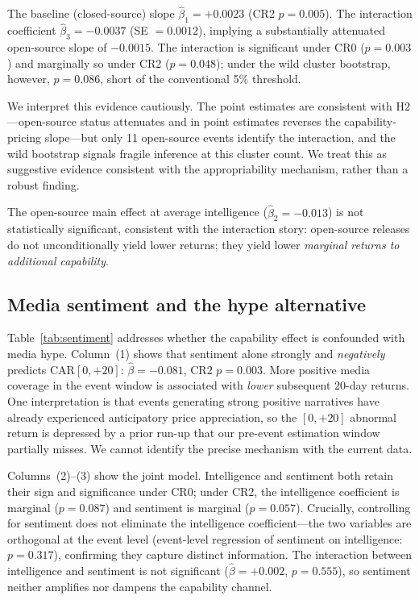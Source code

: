 \documentclass[12pt]{article}
\begin{document}
The baseline (closed-source) slope $\hat{\beta}_1 = +0.0023$ (CR2 $p = 0.005$).
The interaction coefficient $\hat{\beta}_3 = -0.0037$ (SE $= 0.0012$), implying
a substantially attenuated open-source slope of $-0.0015$. The interaction is
significant under CR0 ($p = 0.003$) and marginally so under CR2 ($p = 0.048$);
under the wild cluster bootstrap, however, $p = 0.086$, short of the conventional
5\% threshold.

We interpret this evidence cautiously. The point estimates are consistent with
H2---open-source status attenuates and in point estimates reverses the
capability-pricing slope---but only 11 open-source events identify the interaction,
and the wild bootstrap signals fragile inference at this cluster count. We treat
this as suggestive evidence consistent with the appropriability mechanism, rather
than a robust finding.

The open-source main effect at average intelligence ($\hat{\beta}_2 = -0.013$) is
not statistically significant, consistent with the interaction story: open-source
releases do not unconditionally yield lower returns; they yield lower
\emph{marginal returns to additional capability}.

\subsection{Media sentiment and the hype alternative}

Table~\ref{tab:sentiment} addresses whether the capability effect is confounded
with media hype. Column~(1) shows that sentiment alone strongly and
\emph{negatively} predicts CAR$[0,{+}20]$: $\hat{\beta} = -0.081$,
CR2 $p = 0.003$. More positive media coverage in the event window is associated
with \emph{lower} subsequent 20-day returns. One interpretation is that events
generating strong positive narratives have already experienced anticipatory price
appreciation, so the $[0,{+}20]$ abnormal return is depressed by a prior run-up
that our pre-event estimation window partially misses. We cannot identify the
precise mechanism with the current data.

Columns~(2)--(3) show the joint model. Intelligence and sentiment both retain
their sign and significance under CR0; under CR2, the intelligence coefficient is
marginal ($p = 0.087$) and sentiment is marginal ($p = 0.057$). Crucially,
controlling for sentiment does not eliminate the intelligence coefficient---the
two variables are orthogonal at the event level (event-level regression of
sentiment on intelligence: $p = 0.317$), confirming they capture distinct
information. The interaction between intelligence and sentiment is not significant
($\hat{\beta} = +0.002$, $p = 0.555$), so sentiment neither amplifies nor dampens
the capability channel.
\end{document}
